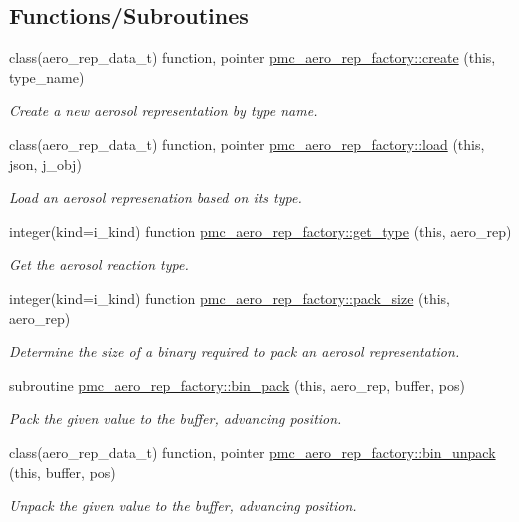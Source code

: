\subsection*{Functions/\+Subroutines}
\begin{DoxyCompactItemize}
\item 
class(aero\+\_\+rep\+\_\+data\+\_\+t) function, pointer \mbox{\hyperlink{namespacepmc__aero__rep__factory_a72db65ee6fcec381e8315f2de1601953}{pmc\+\_\+aero\+\_\+rep\+\_\+factory\+::create}} (this, type\+\_\+name)
\begin{DoxyCompactList}\small\item\em Create a new aerosol representation by type name. \end{DoxyCompactList}\item 
class(aero\+\_\+rep\+\_\+data\+\_\+t) function, pointer \mbox{\hyperlink{namespacepmc__aero__rep__factory_a5c9800b3f829b58b00472eaa3622d23c}{pmc\+\_\+aero\+\_\+rep\+\_\+factory\+::load}} (this, json, j\+\_\+obj)
\begin{DoxyCompactList}\small\item\em Load an aerosol represenation based on its type. \end{DoxyCompactList}\item 
integer(kind=i\+\_\+kind) function \mbox{\hyperlink{namespacepmc__aero__rep__factory_aac521bd3a37de6b47b812d4f1ceb5bb1}{pmc\+\_\+aero\+\_\+rep\+\_\+factory\+::get\+\_\+type}} (this, aero\+\_\+rep)
\begin{DoxyCompactList}\small\item\em Get the aerosol reaction type. \end{DoxyCompactList}\item 
integer(kind=i\+\_\+kind) function \mbox{\hyperlink{namespacepmc__aero__rep__factory_ac1e17208623751a66e657d083e327ebd}{pmc\+\_\+aero\+\_\+rep\+\_\+factory\+::pack\+\_\+size}} (this, aero\+\_\+rep)
\begin{DoxyCompactList}\small\item\em Determine the size of a binary required to pack an aerosol representation. \end{DoxyCompactList}\item 
subroutine \mbox{\hyperlink{namespacepmc__aero__rep__factory_a02df230770bd6e28c72b368d4d824788}{pmc\+\_\+aero\+\_\+rep\+\_\+factory\+::bin\+\_\+pack}} (this, aero\+\_\+rep, buffer, pos)
\begin{DoxyCompactList}\small\item\em Pack the given value to the buffer, advancing position. \end{DoxyCompactList}\item 
class(aero\+\_\+rep\+\_\+data\+\_\+t) function, pointer \mbox{\hyperlink{namespacepmc__aero__rep__factory_a21bfc8099556674323743966b31846b2}{pmc\+\_\+aero\+\_\+rep\+\_\+factory\+::bin\+\_\+unpack}} (this, buffer, pos)
\begin{DoxyCompactList}\small\item\em Unpack the given value to the buffer, advancing position. \end{DoxyCompactList}\end{DoxyCompactItemize}
